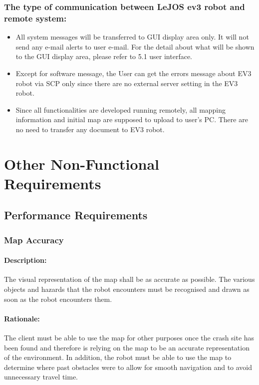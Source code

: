 \documentclass[10pt,a4paper,titlepage]{article}
\begin{document}
	\subsubsection*{The type of communication between LeJOS ev3 robot and remote system:}
	\begin{itemize}
		\item All system messages will be transferred to GUI display area only. It will not send any e-mail alerts to user e-mail. For the detail about what will be shown to the GUI display area, please refer to 5.1 user interface.
		\item Except for software message, the User can get the errors message about EV3 robot via SCP only since there are no external server setting in the EV3 robot.
		\item Since all functionalities are developed running remotely, all mapping information and initial map are supposed to upload to user’s PC. There are no need to transfer any document to EV3 robot.
	\end{itemize}
	
	\section{Other Non-Functional Requirements}
	
	\subsection{Performance Requirements}
	\subsubsection*{Map Accuracy}
	\paragraph{Description:} The visual representation of the map shall be as accurate as possible. The various objects and hazards that the robot encounters must be recognised and drawn as soon as the robot encounters them.
	\paragraph{Rationale:} The client must be able to use the map for other purposes once the crash site has been found and therefore is relying on the map to be an accurate representation of the environment. In addition, the robot must be able to use the map to determine where past obstacles were to allow for smooth navigation and to avoid unnecessary travel time.\\
	
\end{document}
